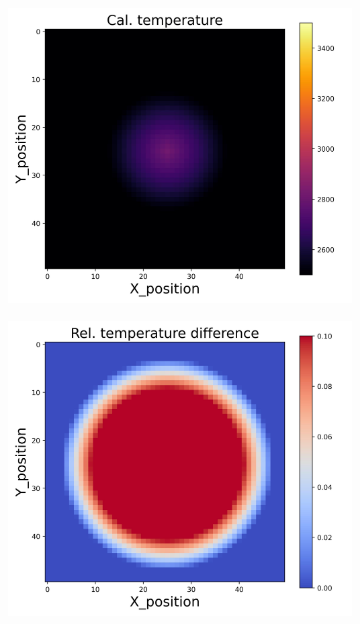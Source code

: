 \begin{figure}[htbp]
    \begin{minipage}{\textwidth}
        \centering
        \begin{subfigure}{0.325\textwidth}
            \centering
            \includegraphics[width=\textwidth]{figures/raw_data/5/T3500/exp/T_cal.jpg}
        \end{subfigure}
        \begin{subfigure}{0.325\textwidth}
            \centering
            \includegraphics[width=\textwidth]{figures/raw_data/5/T3500/exp/T_bias.jpg}

\end{subfigure}
\end{minipage}
\end{figure}
